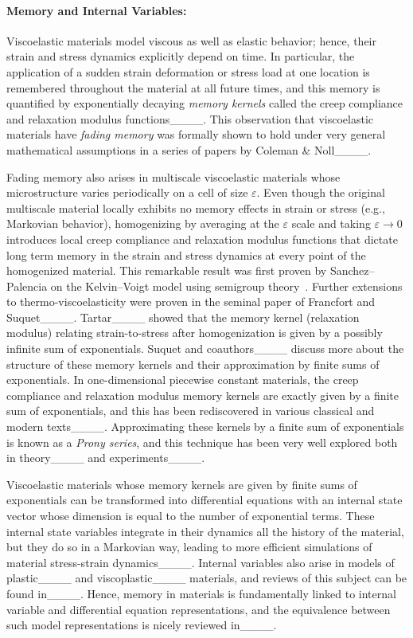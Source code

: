 \paragraph{Memory and Internal Variables:}
Viscoelastic materials model viscous as well as elastic behavior; hence, their strain and stress dynamics explicitly depend on time. In particular, the application of a sudden strain deformation or stress load at one location is remembered throughout the material at all future times, and this memory is quantified by exponentially decaying \textit{memory kernels} called the creep compliance and relaxation modulus functions____. This observation that viscoelastic materials have \textit{fading memory} was formally shown to hold under very general mathematical assumptions in a series of papers by Coleman \& Noll____.

Fading memory also arises in multiscale viscoelastic materials whose microstructure varies periodically on a cell of size $\varepsilon$. Even though the original multiscale material locally exhibits no memory effects in strain or stress (e.g., Markovian behavior), homogenizing by averaging at the $\varepsilon$ scale and taking $\varepsilon \to 0$ introduces local creep compliance and relaxation modulus functions that dictate long term memory in the strain and stress dynamics at every point of the homogenized material. This remarkable result was first proven by Sanchez--Palencia on the Kelvin--Voigt model using semigroup theory~\cite[Chapter 6]{sanchez1980non}. Further extensions to thermo-viscoelasticity were proven in the seminal paper of Francfort and Suquet____. Tartar____ showed that the memory kernel (relaxation modulus) relating strain-to-stress after homogenization is given by a possibly infinite sum of exponentials. Suquet and coauthors____ discuss more about the structure of these memory kernels and their approximation by finite sums of exponentials. In one-dimensional piecewise constant materials, the creep compliance and relaxation modulus memory kernels are exactly given by a finite sum of exponentials, and this has been rediscovered in various classical and modern texts____. Approximating these kernels by a finite sum of exponentials is known as a \textit{Prony series}, and this technique has been very well explored both in theory____ and experiments____.

Viscoelastic materials whose memory kernels are given by finite sums of exponentials can be transformed into differential equations with an internal state vector whose dimension is equal to the number of exponential terms. These internal state variables integrate in their dynamics all the history of the material, but they do so in a Markovian way, leading to more efficient simulations of material stress-strain dynamics____. Internal variables also arise in models of plastic____ and viscoplastic____ materials, and reviews of this subject can be found in____. Hence, memory in materials is fundamentally linked to internal variable and differential equation representations, and the equivalence between such model representations is nicely reviewed in____.~\\

